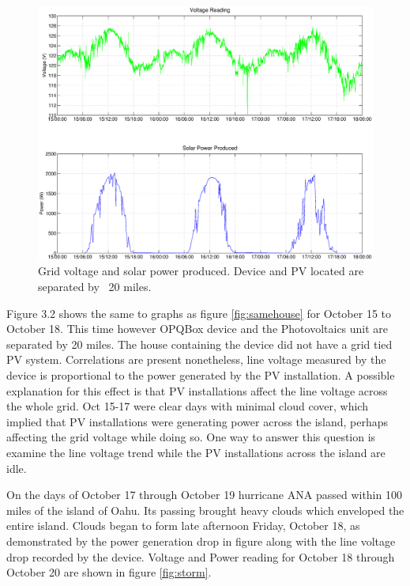 \begin{figure}[h!]
\centering
\includegraphics[width=\textwidth]{img/SunnyWeather.eps}
\caption{Grid voltage and solar power produced. Device and PV located are separated by ~20 miles.}
\label{fig:diffhouse}
\end{figure} 

Figure 3.2 shows the same to graphs as figure \ref{fig:samehouse} for October 15 to October 18. This time however OPQBox device and the Photovoltaics unit are separated by 20 miles. The house
containing the device did not have a grid tied PV system. Correlations are present nonetheless, line voltage measured by the device is proportional to the power generated by the PV installation.
A possible explanation for this effect is that PV installations affect the line voltage across the whole grid. Oct 15-17 were clear days with minimal cloud cover, which implied that PV
installations were generating power across the island, perhaps affecting the grid voltage while doing so. One way to answer this question is examine the line voltage trend while the PV installations
across the island are idle. 

On the days of October 17 through October 19 hurricane ANA passed within 100 miles of the island of Oahu. Its passing brought heavy clouds which enveloped the entire island. Clouds began to form 
late afternoon Friday, October 18, as demonstrated by the power generation drop in figure  along with the line voltage drop recorded by the device. Voltage and Power reading for
October 18 through October 20 are shown in figure \ref{fig:storm}.


